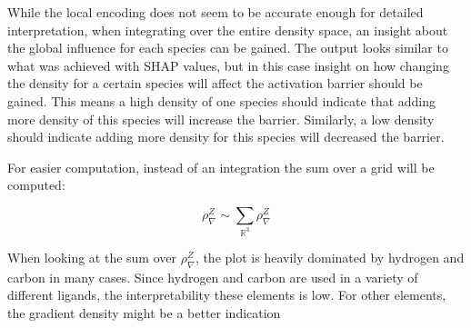 While the local encoding does not seem to be accurate enough for detailed interpretation,
when integrating over the entire density space, an insight about the global influence for each species can be gained.
The output looks similar to what was achieved with SHAP values, but in this case insight on how changing the density for a certain species will affect the activation barrier should be gained.
This means a high density of one species should indicate that adding more density of this species will increase the barrier.
Similarly, a low density should indicate adding more density for this species will decreased the barrier. %

For easier computation, instead of an integration the sum over a grid will be computed: 

$$ \rho_\nabla^Z \sim \sum_{\mathbb{R}^3} \rho_\nabla^Z $$

When looking at the sum over $\rho^Z_\nabla$, the plot is heavily dominated by hydrogen and carbon
in many cases.
Since hydrogen and carbon are used in a variety of different ligands, the interpretability
these elements is low.
For other elements, the gradient density might be a better indication 



